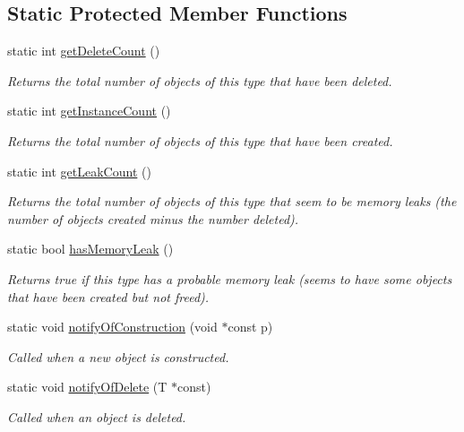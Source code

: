 \subsection*{Static Protected Member Functions}
\begin{DoxyCompactItemize}
\item 
static int \mbox{\hyperlink{classManaged_add9e9d39e8a6f6ee972898d928b65ad3}{get\+Delete\+Count}} ()
\begin{DoxyCompactList}\small\item\em Returns the total number of objects of this type that have been deleted. \end{DoxyCompactList}\item 
static int \mbox{\hyperlink{classManaged_ae7adc08acbd8f6db8e7b98ad0709d9f4}{get\+Instance\+Count}} ()
\begin{DoxyCompactList}\small\item\em Returns the total number of objects of this type that have been created. \end{DoxyCompactList}\item 
static int \mbox{\hyperlink{classManaged_ad6fcbfd737c828fe9a7ed1a5008a2d56}{get\+Leak\+Count}} ()
\begin{DoxyCompactList}\small\item\em Returns the total number of objects of this type that seem to be memory leaks (the number of objects created minus the number deleted). \end{DoxyCompactList}\item 
static bool \mbox{\hyperlink{classManaged_a0f7c4d11f087bd2ca4b2499e163b6285}{has\+Memory\+Leak}} ()
\begin{DoxyCompactList}\small\item\em Returns true if this type has a probable memory leak (seems to have some objects that have been created but not freed). \end{DoxyCompactList}\item 
static void \mbox{\hyperlink{classManaged_a8c9fc6e457eee241a98aa675a241642a}{notify\+Of\+Construction}} (void $\ast$const p)
\begin{DoxyCompactList}\small\item\em Called when a new object is constructed. \end{DoxyCompactList}\item 
static void \mbox{\hyperlink{classManaged_a5077633649d2c853d0b800e0722da369}{notify\+Of\+Delete}} (T $\ast$const)
\begin{DoxyCompactList}\small\item\em Called when an object is deleted. \end{DoxyCompactList}\item 

\end{DoxyCompactItemize}

